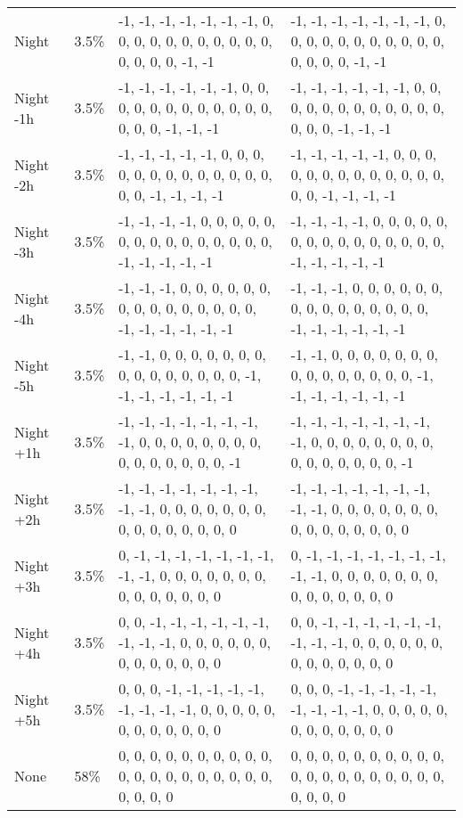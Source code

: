 \begin{longtable}[]{@{}llll@{}}
Night & 3.5\% & -1, -1, -1, -1, -1, -1, -1, 0, 0, 0, 0, 0, 0, 0, 0, 0,
0, 0, 0, 0, 0, 0, -1, -1 & -1, -1, -1, -1, -1, -1, -1, 0, 0, 0, 0, 0, 0,
0, 0, 0, 0, 0, 0, 0, 0, 0, -1, -1 \\
Night -1h & 3.5\% & -1, -1, -1, -1, -1, -1, 0, 0, 0, 0, 0, 0, 0, 0, 0,
0, 0, 0, 0, 0, 0, -1, -1, -1 & -1, -1, -1, -1, -1, -1, 0, 0, 0, 0, 0, 0,
0, 0, 0, 0, 0, 0, 0, 0, 0, -1, -1, -1 \\
Night -2h & 3.5\% & -1, -1, -1, -1, -1, 0, 0, 0, 0, 0, 0, 0, 0, 0, 0, 0,
0, 0, 0, 0, -1, -1, -1, -1 & -1, -1, -1, -1, -1, 0, 0, 0, 0, 0, 0, 0, 0,
0, 0, 0, 0, 0, 0, 0, -1, -1, -1, -1 \\
Night -3h & 3.5\% & -1, -1, -1, -1, 0, 0, 0, 0, 0, 0, 0, 0, 0, 0, 0, 0,
0, 0, 0, -1, -1, -1, -1, -1 & -1, -1, -1, -1, 0, 0, 0, 0, 0, 0, 0, 0, 0,
0, 0, 0, 0, 0, 0, -1, -1, -1, -1, -1 \\
Night -4h & 3.5\% & -1, -1, -1, 0, 0, 0, 0, 0, 0, 0, 0, 0, 0, 0, 0, 0,
0, 0, -1, -1, -1, -1, -1, -1 & -1, -1, -1, 0, 0, 0, 0, 0, 0, 0, 0, 0, 0,
0, 0, 0, 0, 0, -1, -1, -1, -1, -1, -1 \\
Night -5h & 3.5\% & -1, -1, 0, 0, 0, 0, 0, 0, 0, 0, 0, 0, 0, 0, 0, 0, 0,
-1, -1, -1, -1, -1, -1, -1 & -1, -1, 0, 0, 0, 0, 0, 0, 0, 0, 0, 0, 0, 0,
0, 0, 0, -1, -1, -1, -1, -1, -1, -1 \\
Night +1h & 3.5\% & -1, -1, -1, -1, -1, -1, -1, -1, 0, 0, 0, 0, 0, 0, 0,
0, 0, 0, 0, 0, 0, 0, 0, -1 & -1, -1, -1, -1, -1, -1, -1, -1, 0, 0, 0, 0,
0, 0, 0, 0, 0, 0, 0, 0, 0, 0, 0, -1 \\
Night +2h & 3.5\% & -1, -1, -1, -1, -1, -1, -1, -1, -1, 0, 0, 0, 0, 0,
0, 0, 0, 0, 0, 0, 0, 0, 0, 0 & -1, -1, -1, -1, -1, -1, -1, -1, -1, 0, 0,
0, 0, 0, 0, 0, 0, 0, 0, 0, 0, 0, 0, 0 \\
Night +3h & 3.5\% & 0, -1, -1, -1, -1, -1, -1, -1, -1, -1, 0, 0, 0, 0,
0, 0, 0, 0, 0, 0, 0, 0, 0, 0 & 0, -1, -1, -1, -1, -1, -1, -1, -1, -1, 0,
0, 0, 0, 0, 0, 0, 0, 0, 0, 0, 0, 0, 0 \\
Night +4h & 3.5\% & 0, 0, -1, -1, -1, -1, -1, -1, -1, -1, -1, 0, 0, 0,
0, 0, 0, 0, 0, 0, 0, 0, 0, 0 & 0, 0, -1, -1, -1, -1, -1, -1, -1, -1, -1,
0, 0, 0, 0, 0, 0, 0, 0, 0, 0, 0, 0, 0 \\
Night +5h & 3.5\% & 0, 0, 0, -1, -1, -1, -1, -1, -1, -1, -1, -1, 0, 0,
0, 0, 0, 0, 0, 0, 0, 0, 0, 0 & 0, 0, 0, -1, -1, -1, -1, -1, -1, -1, -1,
-1, 0, 0, 0, 0, 0, 0, 0, 0, 0, 0, 0, 0 \\
None & 58\% & 0, 0, 0, 0, 0, 0, 0, 0, 0, 0, 0, 0, 0, 0, 0, 0, 0, 0, 0,
0, 0, 0, 0, 0 & 0, 0, 0, 0, 0, 0, 0, 0, 0, 0, 0, 0, 0, 0, 0, 0, 0, 0, 0,
0, 0, 0, 0, 0 \\
\end{longtable}


